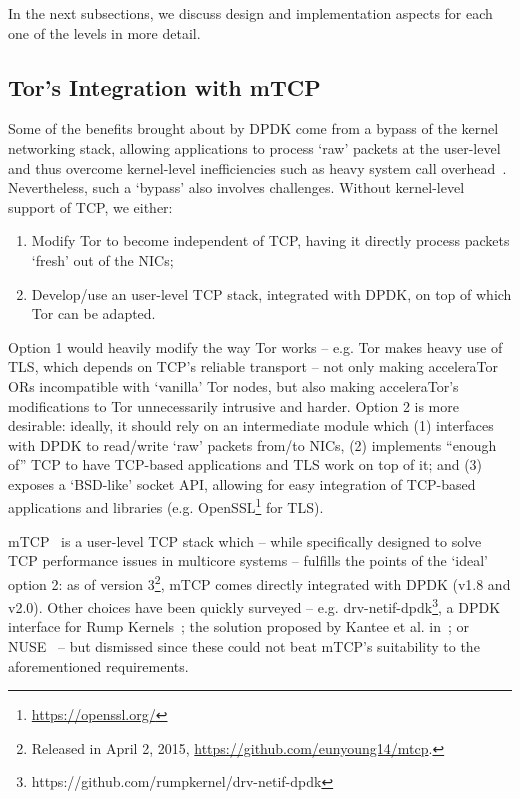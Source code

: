 In the next subsections, we discuss design and implementation aspects for each 
one of the levels in more detail.

\subsection{Tor's Integration with mTCP}
\label{subsec:design-mtcp}

Some of the benefits brought about by DPDK come from a bypass of the kernel 
networking stack, allowing applications to process `raw' packets at the 
user-level and thus overcome kernel-level inefficiencies such as heavy system 
call overhead~\cite{179773, Brouer2014}. Nevertheless, such a `bypass' also 
involves challenges. Without kernel-level support of TCP, we either: 

\begin{enumerate}
	\item Modify Tor to become independent of TCP, having it directly process 
		packets `fresh' out of the NICs;
	\item Develop\slash use an user-level TCP stack, integrated with DPDK, on 
		top of which Tor can be adapted.
\end{enumerate}

Option 1 would heavily modify the way Tor 
works -- e.g. Tor makes heavy use of TLS, which depends on TCP's reliable transport -- not 
only making acceleraTor ORs incompatible with `vanilla' Tor nodes, 
but also making acceleraTor's modifications to Tor unnecessarily intrusive and harder. Option 2 is 
more desirable: ideally, it should rely on an intermediate module which (1) interfaces with 
DPDK to read\slash write `raw' packets from\slash to NICs, (2) implements ``enough of'' TCP to 
have TCP-based applications and TLS work on top of it; and (3) exposes a 
`BSD-like' socket API, allowing for easy integration of TCP-based applications 
and libraries (e.g. OpenSSL\footnote{\url{https://openssl.org/}} for TLS).

mTCP~\cite{179773} is a user-level TCP stack which -- while specifically 
designed to solve TCP performance issues in multicore systems -- fulfills the 
points of the `ideal' option 2: as of version 3\footnote{Released in 
April 2, 2015, \url{https://github.com/eunyoung14/mtcp}.}, mTCP comes directly 
integrated with DPDK (v1.8 and v2.0). Other choices have been quickly 
surveyed -- e.g. drv-netif-dpdk\footnote{https://github.com/rumpkernel/drv-netif-dpdk}, a 
DPDK interface for Rump Kernels~\cite{Rump2015}; the solution proposed by Kantee 
et al. in~\cite{Kantee2009}; or NUSE~\cite{Nuse2015} -- but dismissed since these 
could not beat mTCP's suitability to the aforementioned requirements.

